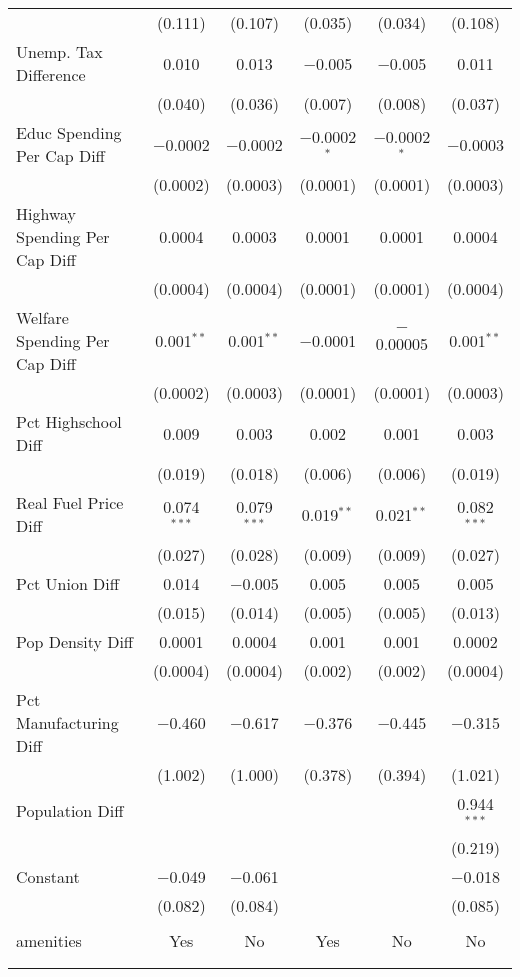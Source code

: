 \begin{table}[!htbp]
\begin{tabular}{@{\extracolsep{5pt}}lccccc}
  & (0.111) & (0.107) & (0.035) & (0.034) & (0.108) \\ 
  Unemp. Tax Difference & 0.010 & 0.013 & $-$0.005 & $-$0.005 & 0.011 \\ 
  & (0.040) & (0.036) & (0.007) & (0.008) & (0.037) \\ 
  Educ Spending Per Cap Diff & $-$0.0002 & $-$0.0002 & $-$0.0002$^{*}$ & $-$0.0002$^{*}$ & $-$0.0003 \\ 
  & (0.0002) & (0.0003) & (0.0001) & (0.0001) & (0.0003) \\ 
  Highway Spending Per Cap Diff & 0.0004 & 0.0003 & 0.0001 & 0.0001 & 0.0004 \\ 
  & (0.0004) & (0.0004) & (0.0001) & (0.0001) & (0.0004) \\ 
  Welfare Spending Per Cap Diff & 0.001$^{**}$ & 0.001$^{**}$ & $-$0.0001 & $-$0.00005 & 0.001$^{**}$ \\ 
  & (0.0002) & (0.0003) & (0.0001) & (0.0001) & (0.0003) \\ 
  Pct Highschool Diff & 0.009 & 0.003 & 0.002 & 0.001 & 0.003 \\ 
  & (0.019) & (0.018) & (0.006) & (0.006) & (0.019) \\ 
  Real Fuel Price Diff & 0.074$^{***}$ & 0.079$^{***}$ & 0.019$^{**}$ & 0.021$^{**}$ & 0.082$^{***}$ \\ 
  & (0.027) & (0.028) & (0.009) & (0.009) & (0.027) \\ 
  Pct Union Diff & 0.014 & $-$0.005 & 0.005 & 0.005 & 0.005 \\ 
  & (0.015) & (0.014) & (0.005) & (0.005) & (0.013) \\ 
  Pop Density Diff & 0.0001 & 0.0004 & 0.001 & 0.001 & 0.0002 \\ 
  & (0.0004) & (0.0004) & (0.002) & (0.002) & (0.0004) \\ 
  Pct Manufacturing Diff & $-$0.460 & $-$0.617 & $-$0.376 & $-$0.445 & $-$0.315 \\ 
  & (1.002) & (1.000) & (0.378) & (0.394) & (1.021) \\ 
  Population Diff &  &  &  &  & 0.944$^{***}$ \\ 
  &  &  &  &  & (0.219) \\ 
  Constant & $-$0.049 & $-$0.061 &  &  & $-$0.018 \\ 
  & (0.082) & (0.084) &  &  & (0.085) \\ 
 \hline \\[-1.8ex] 
amenities & Yes & No & Yes & No & No \\ 
\hline \\[-1.8ex] 
\hline 
\hline \\[-1.8ex] 
\end{tabular} 
\end{table} 
